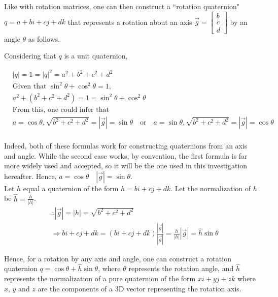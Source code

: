 \documentclass[12pt, a4paper]{article}
\begin{document}
Like with rotation matrices, one can then construct a ``rotation quaternion" $q =
a + bi + cj +dk$ that represents a rotation about an axis $\vec{g} =
\begin{bmatrix} b \\ c \\ d \end{bmatrix}$ by an angle $\theta$ as follows. %


Considering that $q$ is a unit quaternion,

\begin{align*}
    &|q| = 1 = |q|^2 = a^2 + b^2 + c^2 + d^2 \\
    &\text{Given that } \sin^2\theta + \cos^2\theta = 1, \\
    &a^2 + (b^2 + c^2 + d^2) = 1 = \sin^2\theta + \cos^2\theta \\
    &\text{From this, one could infer that} \\
    &a = \cos\theta, \sqrt{b^2 + c^2 + d^2} = |\vec{g}| = \sin\theta \quad \text{or} \quad a = \sin\theta, \sqrt{b^2 + c^2 + d^2} = |\vec{g}| = \cos\theta \\
\end{align*}

Indeed, both of these formulas work for constructing quaternions from an axis
and angle. While the second case works, by convention, the first formula is far
more widely used and accepted, so it will be the one used in this investigation
hereafter. Hence, $a = \cos\theta \quad |\vec{g}| = \sin\theta$. \\

Let $h$ equal a quaternion of the form $h = bi + cj + dk$. Let the normalization
of $h$ be $\hat{h} = \frac{h}{|h|}$. \\
\begin{align*}
    &\therefore |\vec{g}| = |h| = \sqrt{b^2 + c^2 + d^2} \\
    &\Rightarrow bi + cj + dk = (bi + cj + dk)\frac{|\vec{g}|}{|\vec{g}|} = \frac{h}{|h|}|\vec{g}| = \hat{h}\sin\theta
\end{align*}

Hence, for a rotation by any axis and angle, one can construct a rotation
quaternion $q = \cos\theta + \hat{h}\sin\theta$, where $\theta$ represents the
rotation angle, and $\hat{h}$ represents the normalization of a pure quaternion
of the form $xi + yj + zk$ where $x$, $y$ and $z$ are the components of a 3D
vector representing the rotation axis. \\
\end{document}
